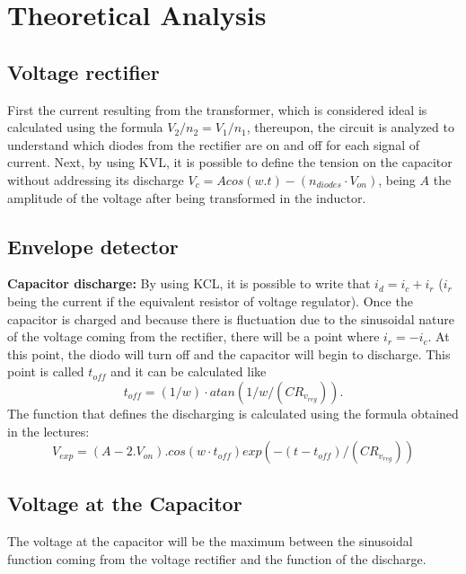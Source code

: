 \section{Theoretical Analysis}
\label{sec:theoretical analysis}

\subsection{Voltage rectifier}
First the current resulting from the transformer, which is considered ideal is calculated using the formula $V_2/n_2=V_1/n_1 $, thereupon, the circuit is analyzed to understand which diodes from the rectifier are on and off for each signal of current. Next, by using KVL, it is possible to define the tension on the capacitor without addressing its discharge $V_c=A cos(w.t)-(n_{diodes} \cdot V_{on}) $, being $A$ the amplitude of the voltage after being transformed in the inductor. 

\subsection{Envelope detector}

\textbf{Capacitor discharge:}
By using KCL, it is possible to write that $i_d = i_c + i_r$ ($i_r$ being the current if the equivalent resistor of voltage regulator).
Once the capacitor is charged and because there is fluctuation due to the sinusoidal nature of the voltage coming from the rectifier, there will be a point where $i_r = -i_c$. At this point, the diodo will turn off and the capacitor will begin to discharge. This point is called $t_{off}$ and it can be calculated like $$ t_{off}=(1/w)\cdot atan(1/w/(C R_{v_{reg}})).$$The function that defines the discharging is calculated using the formula obtained in the lectures: $$ V_{exp}=(A-2.V_{on}).cos(w \cdot t_{off})exp(-(t-t_{off})/(CR_{v_{reg}}))$$




\subsection{Voltage at the Capacitor}

The voltage at the capacitor will be the maximum between the sinusoidal function coming from the voltage rectifier and the function of the discharge.

